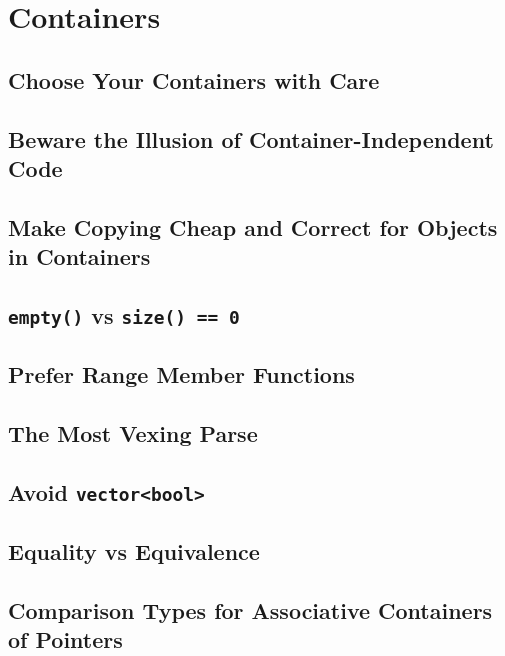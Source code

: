\section{Containers}\label{sec:containers}

\subsection{Choose Your Containers with Care}

\subsection{Beware the Illusion of Container-Independent Code}

\subsection{Make Copying Cheap and Correct for Objects in Containers}

\subsection{\texttt{empty()} vs \texttt{size() == 0}}

\subsection{Prefer Range Member Functions}

\subsection{The Most Vexing Parse}

\subsection{Avoid \texttt{vector<bool>}}

\subsection{Equality vs Equivalence}

\subsection{Comparison Types for Associative Containers of Pointers}

